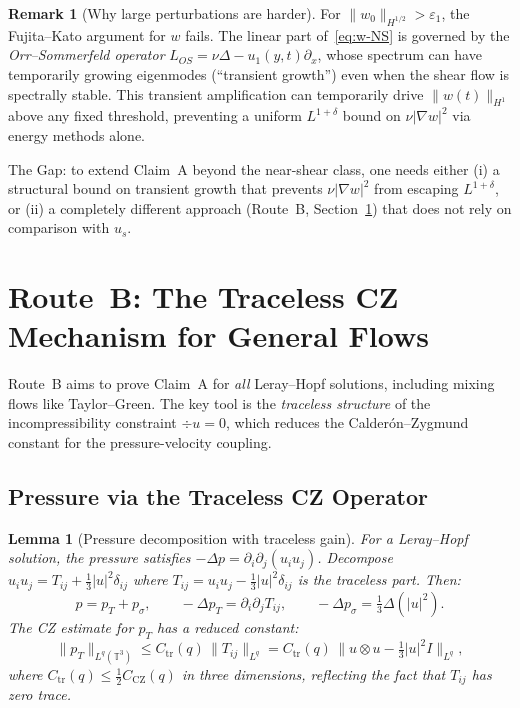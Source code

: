 \documentclass[11pt]{article}
\newtheorem{lemma}[theorem]{Lemma}
\theoremstyle{definition}
\newtheorem{remark}[theorem]{Remark}
\theoremstyle{remark}
\newcommand{\T}{\mathbb{T}}
\begin{document}
\begin{remark}[Why large perturbations are harder]
  For $\|w_0\|_{H^{1/2}}>\varepsilon_1$, the Fujita--Kato argument for $w$
  fails.  The linear part of~\eqref{eq:w-NS} is governed by the
  \emph{Orr--Sommerfeld operator}
  $L_{OS}=\nu\Delta-u_1(y,t)\partial_x$, whose spectrum can have
  temporarily growing eigenmodes (``transient growth'') even when the
  shear flow is spectrally stable.  This transient amplification can
  temporarily drive $\|w(t)\|_{H^1}$ above any fixed threshold,
  preventing a uniform $L^{1+\delta}$ bound on $\nu|\nabla w|^2$ via
  energy methods alone.

  The Gap: to extend Claim~A beyond the near-shear class, one needs
  either (i) a structural bound on transient growth that prevents
  $\nu|\nabla w|^2$ from escaping $L^{1+\delta}$, or (ii) a completely
  different approach (Route~B, Section~\ref{sec:route-B-CZ}) that does
  not rely on comparison with $u_s$.
\end{remark}

\section{Route~B: The Traceless CZ Mechanism for General Flows}
\label{sec:route-B-CZ}

Route~B aims to prove Claim~A for \emph{all} Leray--Hopf solutions,
including mixing flows like Taylor--Green.  The key tool is the
\emph{traceless structure} of the incompressibility constraint $\div u=0$,
which reduces the Calder\'on--Zygmund constant for the pressure-velocity
coupling.

\subsection{Pressure via the Traceless CZ Operator}
\label{sec:CZ-traceless}

\begin{lemma}[Pressure decomposition with traceless gain]
\label{lem:pressure-traceless}
  For a Leray--Hopf solution, the pressure satisfies
  $-\Delta p = \partial_i\partial_j(u_iu_j)$.
  Decompose $u_iu_j = T_{ij} + \tfrac{1}{3}|u|^2\delta_{ij}$
  where $T_{ij}=u_iu_j-\tfrac{1}{3}|u|^2\delta_{ij}$ is the
  traceless part.  Then:
  \begin{equation}\label{eq:p-decomp}
    p = p_T + p_\sigma,
    \qquad
    -\Delta p_T = \partial_i\partial_j T_{ij},
    \qquad
    -\Delta p_\sigma = \tfrac{1}{3}\Delta(|u|^2).
  \end{equation}
  The CZ estimate for $p_T$ has a \emph{reduced constant}:
  \begin{equation}\label{eq:CZ-traceless}
    \|p_T\|_{L^q(\T^3)} \leq C_{\mathrm{tr}}(q)\,\|T_{ij}\|_{L^q}
    = C_{\mathrm{tr}}(q)\,\|u\otimes u - \tfrac{1}{3}|u|^2 I\|_{L^q},
  \end{equation}
  where $C_{\mathrm{tr}}(q)\leq\tfrac{1}{2}C_{\mathrm{CZ}}(q)$ in three
  dimensions, reflecting the fact that $T_{ij}$ has zero trace.
\end{lemma}
\end{document}
